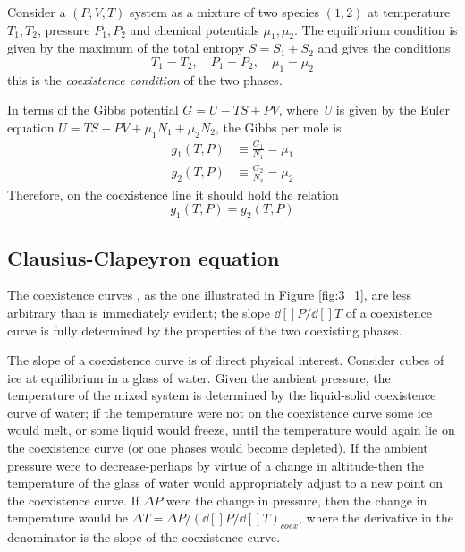 \documentclass[../main/main.tex]{subfiles}
\begin{document}
Consider a \( (P,V,T) \) system as a mixture of two species \( (1,2) \) at temperature \( T_1, T_2 \), pressure \( P_1, P_2 \) and chemical potentials \( \mu _1,\mu _2 \). The equilibrium condition is given by the maximum of the total entropy \( S = S_1 + S_2 \) and gives the conditions
\begin{equation}
  T_1 = T_2, \quad P_1 = P_2, \quad \mu _1 = \mu _2
  \label{eq:}
\end{equation}
this is the \emph{coexistence condition} of the two phases.

In terms of the Gibbs potential \( G = U- TS+PV \), where \emph{U} is given by  the Euler equation \( U = TS-PV+ \mu _1 N_1 + \mu _2 N_2 \), the Gibbs per mole is
\begin{subequations}
\begin{align}
  g_1 (T,P) &\equiv \frac{G_1}{N_1} = \mu _1 \\
  g_2 (T,P) &\equiv \frac{G_2}{N_2} = \mu _2
\end{align}
\label{}
\end{subequations}
Therefore, on the coexistence line it should hold the relation
\begin{equation}
  g_1 (T,P) = g_2 (T,P)
  \label{eq:}
\end{equation}

\subsection{Clausius-Clapeyron equation}
The coexistence curves \cite{3_lesson_2}, as the one illustrated in Figure  \ref{fig:3_1}, are less arbitrary than is immediately evident; the slope \( \dd[]{P} /\dd[]{T}   \) of a coexistence curve is fully determined by the properties of the two coexisting phases.

The slope of a coexistence curve is of direct physical interest. Consider cubes of ice at equilibrium in a glass of water. Given the ambient pressure, the temperature of the mixed system is determined by the liquid-solid coexistence curve of water; if the temperature were not on the coexistence curve some ice would melt, or some liquid would freeze, until the temperature would again lie on the coexistence curve (or one phases would become depleted). If the ambient pressure were to decrease-perhaps by virtue of a change in altitude-then the temperature of the glass of water would appropriately adjust to a new point on the coexistence curve. If \( \Delta P \) were the change in pressure, then the change in temperature would be \( \Delta T = \Delta P / (\dd[]{P} /\dd[]{T})_{coex} \), where the derivative in the denominator is the slope of the coexistence curve.
\end{document}
